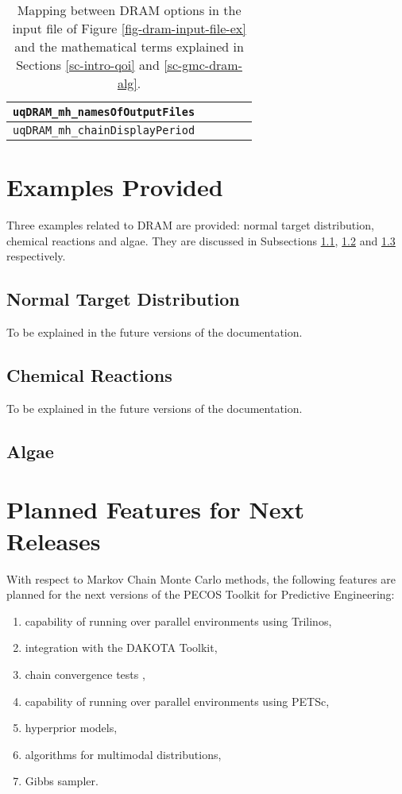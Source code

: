 \begin{sidewaystable}
\begin{tabular}{|l|c|c|c|c|}
\hline
\verb=uqDRAM_mh_namesOfOutputFiles=      &                   &               &             &                   \\
\hline
\verb=uqDRAM_mh_chainDisplayPeriod=      &                   &               &             &                   \\
\hline
\end{tabular}
\caption{Mapping between DRAM options in the input file of Figure \ref{fig-dram-input-file-ex} and the mathematical terms explained in Sections \ref{sc-intro-qoi} and \ref{sc-gmc-dram-alg}.}
\label{tab-dram-map}
\end{sidewaystable}

\section{Examples Provided}\label{sc-gmc-dram-examples}

Three examples related to DRAM are provided: normal target distribution, chemical reactions and algae.
They are discussed in Subsections \ref{subsc-gmc-dram-normal-ex}, \ref{subsc-gmc-dram-himmel-ex} and \ref{subsc-gmc-dram-algae-ex} respectively.

\subsection{Normal Target Distribution}\label{subsc-gmc-dram-normal-ex}

To be explained in the future versions of the documentation.

\subsection{Chemical Reactions}\label{subsc-gmc-dram-himmel-ex}

To be explained in the future versions of the documentation.

\subsection{Algae}\label{subsc-gmc-dram-algae-ex}

\section{Planned Features for Next Releases}\label{sc-gmc-planned-features}
With respect to Markov Chain Monte Carlo methods, the following features are planned for the next versions of the PECOS Toolkit for Predictive Engineering:
\begin{enumerate}
\item capability of running over parallel environments using Trilinos,
\item integration with the DAKOTA Toolkit,
\item chain convergence tests \cite{BrRo98},
\item capability of running over parallel environments using PETSc,
\item hyperprior models,
\item algorithms for multimodal distributions,
\item Gibbs sampler.
\end{enumerate}

